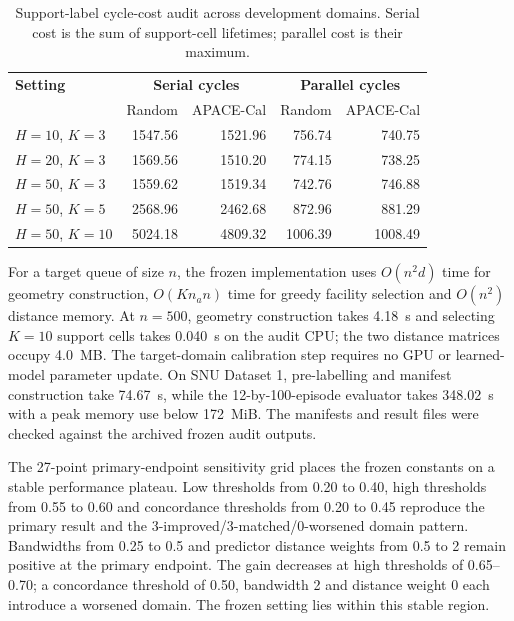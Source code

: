 \documentclass[preprint,12pt]{elsarticle}
\begin{document}
\begin{table}[H]
\centering
\small
\caption{Support-label cycle-cost audit across development domains. Serial cost is the sum of support-cell lifetimes; parallel cost is their maximum.}
\label{tab:efficiency}
\begin{tabular*}{\textwidth}{@{\extracolsep{\fill}}lrrrr}
\toprule
\textbf{Setting} & \multicolumn{2}{c}{\textbf{Serial cycles}} & \multicolumn{2}{c}{\textbf{Parallel cycles}} \\
 & Random & APACE-Cal & Random & APACE-Cal \\
\midrule
$H=10$, $K=3$ & 1547.56 & 1521.96 & 756.74 & 740.75 \\
$H=20$, $K=3$ & 1569.56 & 1510.20 & 774.15 & 738.25 \\
$H=50$, $K=3$ & 1559.62 & 1519.34 & 742.76 & 746.88 \\
$H=50$, $K=5$ & 2568.96 & 2462.68 & 872.96 & 881.29 \\
$H=50$, $K=10$ & 5024.18 & 4809.32 & 1006.39 & 1008.49 \\
\bottomrule
\end{tabular*}
\end{table}

For a target queue of size $n$, the frozen implementation uses $O(n^2d)$ time for geometry construction, $O(Kn_an)$ time for greedy facility selection and $O(n^2)$ distance memory. At $n=500$, geometry construction takes 4.18~s and selecting $K=10$ support cells takes 0.040~s on the audit CPU; the two distance matrices occupy 4.0~MB. The target-domain calibration step requires no GPU or learned-model parameter update. On SNU Dataset 1, pre-labelling and manifest construction take 74.67~s, while the 12-by-100-episode evaluator takes 348.02~s with a peak memory use below 172~MiB. The manifests and result files were checked against the archived frozen audit outputs.

The 27-point primary-endpoint sensitivity grid places the frozen constants on a stable performance plateau. Low thresholds from 0.20 to 0.40, high thresholds from 0.55 to 0.60 and concordance thresholds from 0.20 to 0.45 reproduce the primary result and the 3-improved/3-matched/0-worsened domain pattern. Bandwidths from 0.25 to 0.5 and predictor distance weights from 0.5 to 2 remain positive at the primary endpoint. The gain decreases at high thresholds of 0.65--0.70; a concordance threshold of 0.50, bandwidth 2 and distance weight 0 each introduce a worsened domain. The frozen setting lies within this stable region.
\end{document}
